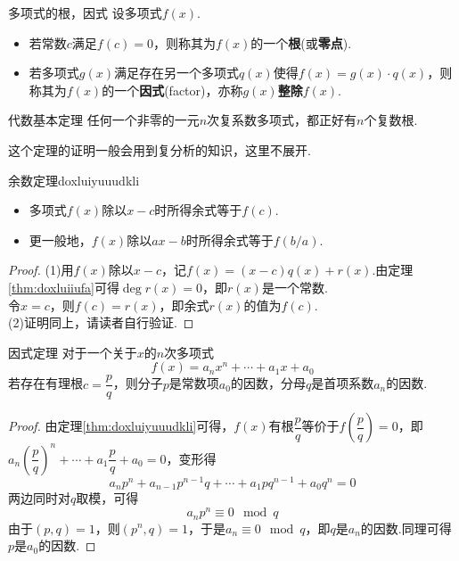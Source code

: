 \documentclass[lang=cn, zihao=5]{elegantbook}
\newcommand{\ssb}[1]{\left( #1 \right)}
\begin{document}
\begin{definition}{多项式的根，因式}
	设多项式$f(x)$.
	\begin{itemize}
		\item 若常数$c$满足$f(c)=0$，则称其为$f(x)$的一个\textbf{根}(或\textbf{零点}).
		\item 若多项式$g(x)$满足存在另一个多项式$q(x)$使得$f(x)=g(x) \cdot q(x)$，则称其为$f(x)$的一个\textbf{因式}(factor)，亦称$g(x)$\textbf{整除}$f(x)$.
	\end{itemize}
\end{definition}

\begin{theorem}{代数基本定理}
	任何一个非零的一元$n$次复系数多项式，都正好有$n$个复数根.
\end{theorem}
\begin{remark}
	这个定理的证明一般会用到复分析的知识，这里不展开.
\end{remark}

\begin{theorem}{余数定理}{doxluiyuuudkli}
	\begin{itemize}
		\item 多项式$f(x)$除以$x-c$时所得余式等于$f(c)$.
		\item 更一般地，$f(x)$除以$ax-b$时所得余式等于$f(b/a)$.
	\end{itemize}
\end{theorem}
\begin{proof}
	(1)用$f(x)$除以$x-c$，记$f(x)=(x-c)q(x)+r(x)$.由定理\ref{thm:doxluiiufa}可得$\deg r(x) =0$，即$r(x)$是一个常数. \\
	令$x=c$，则$f(c)=r(x)$，即余式$r(x)$的值为$f(c)$. \\
	(2)证明同上，请读者自行验证.
\end{proof}

\begin{theorem}{因式定理}
    对于一个关于$x$的$n$次多项式$$f(x)=a_nx^n+ \cdots +a_1x+a_0$$若存在有理根$c=\dfrac{p}{q}$，则分子$p$是常数项$a_0$的因数，分母$q$是首项系数$a_n$的因数.
\end{theorem}
\begin{proof}
	由定理\ref{thm:doxluiyuuudkli}可得，$f(x)$有根$\dfrac{p}{q}$等价于$f\ssb{\dfrac{p}{q}}=0$，即
	$a_n \ssb{\dfrac{p}{q}}^n + \cdots + a_1 \dfrac{p}{q} + a_0 = 0$，变形得
	$$a_np^n + a_{n-1}p^{n-1}q + \cdots + a_1pq^{n-1} + a_0q^n = 0$$
	两边同时对$q$取模，可得$$a_np^n \equiv 0 \mod q$$
	由于$(p,q)=1$，则$(p^n,q)=1$，于是$a_n \equiv 0 \mod q$，即$q$是$a_n$的因数.同理可得$p$是$a_0$的因数.
\end{proof}
\end{document}
